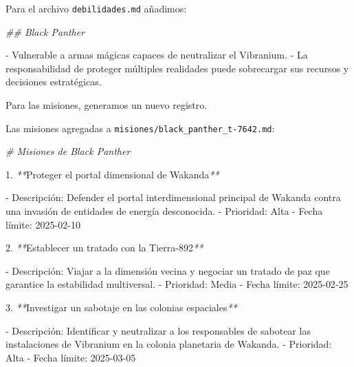 \documentclass[
]{book}
\newenvironment{Shaded}{\begin{snugshade}}{\end{snugshade}}
\newcommand{\CommentTok}[1]{\textcolor[rgb]{0.56,0.35,0.01}{\textit{#1}}}
\newcommand{\ExtensionTok}[1]{#1}
\newcommand{\NormalTok}[1]{#1}
\newcommand{\PreprocessorTok}[1]{\textcolor[rgb]{0.56,0.35,0.01}{\textit{#1}}}
\begin{document}
Para el archivo \texttt{debilidades.md} añadimos:

\begin{Shaded}
\begin{Highlighting}[]

\CommentTok{\#\# Black Panther}

\ExtensionTok{{-}}\NormalTok{ Vulnerable a armas mágicas capaces de neutralizar el Vibranium.}
\ExtensionTok{{-}}\NormalTok{ La responsabilidad de proteger múltiples realidades puede sobrecargar sus recursos y decisiones estratégicas.}
\end{Highlighting}
\end{Shaded}

Para las misiones, generamos un nuevo registro.

Las misiones agregadas a \texttt{misiones/black\_panther\_t-7642.md}:

\begin{Shaded}
\begin{Highlighting}[]
\CommentTok{\# Misiones de Black Panther}

\ExtensionTok{1.} \PreprocessorTok{**}\NormalTok{Proteger el portal dimensional de Wakanda}\PreprocessorTok{**}

   \ExtensionTok{{-}}\NormalTok{ Descripción: Defender el portal interdimensional principal de Wakanda contra una invasión de entidades de energía desconocida.}
   \ExtensionTok{{-}}\NormalTok{ Prioridad: Alta}
   \ExtensionTok{{-}}\NormalTok{ Fecha límite: 2025{-}02{-}10}

\ExtensionTok{2.} \PreprocessorTok{**}\NormalTok{Establecer un tratado con la Tierra{-}892}\PreprocessorTok{**}

   \ExtensionTok{{-}}\NormalTok{ Descripción: Viajar a la dimensión vecina y negociar un tratado de paz que garantice la estabilidad multiversal.}
   \ExtensionTok{{-}}\NormalTok{ Prioridad: Media}
   \ExtensionTok{{-}}\NormalTok{ Fecha límite: 2025{-}02{-}25}

\ExtensionTok{3.} \PreprocessorTok{**}\NormalTok{Investigar un sabotaje en las colonias espaciales}\PreprocessorTok{**}

   \ExtensionTok{{-}}\NormalTok{ Descripción: Identificar y neutralizar a los responsables de sabotear las instalaciones de Vibranium en la colonia planetaria de Wakanda.}
   \ExtensionTok{{-}}\NormalTok{ Prioridad: Alta}
   \ExtensionTok{{-}}\NormalTok{ Fecha límite: 2025{-}03{-}05}
\end{Highlighting}
\end{Shaded}
\end{document}
